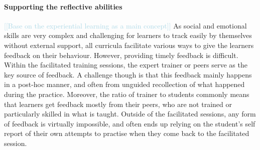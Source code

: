 \documentclass[prodmode,acmtochi]{acmsmall}
\newcommand{\todo}[1]{\textrm{\textrm{\textcolor{LightBlue}{[[#1]]} } } }
\begin{document}
\paragraph{Supporting the reflective abilities} \todo{Base on the experiential learning as a main concept}
As social and emotional skills are very complex and challenging for learners to track easily by themselves without external support, all curricula facilitate various ways to give the learners feedback on their behaviour. However, providing timely feedback is difficult.  Within the facilitated training sessions, the expert trainer or peers serve as the key source of feedback. A challenge though is that this  feedback mainly happens in a post-hoc manner, and often from unguided recollection of what  happened during the practice. Moreover, the ratio of trainer to students  commonly means that learners get feedback mostly from their peers, who are not trained or particularly skilled in what is taught.
Outside of the facilitated sessions, any form of feedback is virtually impossible, and often ends up relying on the student's self report of  their own attempts  
to practise when they come back to the facilitated session.
\end{document}
